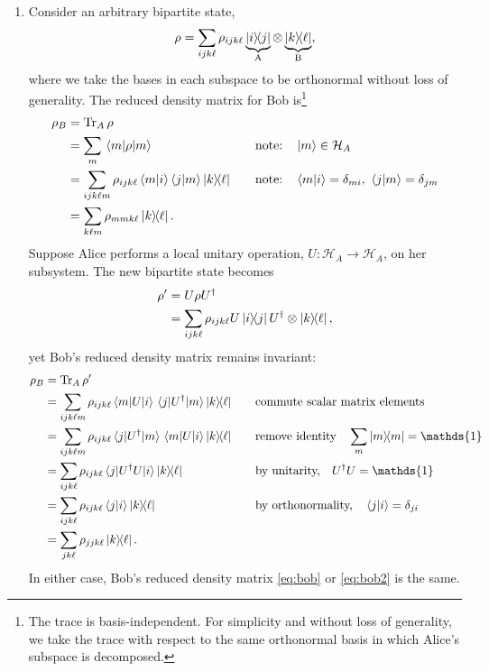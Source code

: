 \documentclass[12pt]{article}
\newcommand*\id{\mathds{1}}
\begin{document}
\begin{appendices}
\begin{enumerate}[label=\alph*)]
\item Consider an arbitrary bipartite state,
\[\rho = \sum_{ijk\ell}\rho_{ijk\ell}
\underbrace{\ketbra{i}{j}}_\text{A} \otimes
\underbrace{\ketbra{k}{\ell}}_\text{B},\]
where we take the bases in each subspace to be orthonormal without loss of generality. The reduced density matrix for Bob is\footnote{The trace is basis-independent. For simplicity and without loss of generality, we take the trace with respect to the same orthonormal basis in which Alice's subspace is decomposed.}
\begin{align}
    \rho_B &= \Tr_A\rho && \\
    &= \sum_m \ev{\rho}{m}
        &&\qq{note:} \ket{m} \in \mathcal{H}_A \\
    &= \sum_{ijk\ell m}\rho_{ijk\ell}
        \braket{m}{i}\braket{j}{m} \ketbra{k}{\ell}
        &&\qq{note:} \braket{m}{i} = \delta_{mi},\
            \braket{j}{m} = \delta_{jm} \\
    &= \sum_{k\ell m}\rho_{mmk\ell} \ketbra{k}{\ell}. && \label{eq:bob}
\end{align}
Suppose Alice performs a local unitary operation, $U : \mathcal{H}_A \rightarrow \mathcal{H}_A$, on her subsystem. The new bipartite state becomes
\begin{align}
    \rho' &= U\rho U^\dag\\
    &= \sum_{ijk\ell}\rho_{ijk\ell}
        U\ketbra{i}{j}U^\dag \otimes \ketbra{k}{\ell},
\end{align}
yet Bob's reduced density matrix remains invariant:
\begin{align}
    \rho_B &= \Tr_A\rho' && \\
    &= \sum_{ijk\ell m}\rho_{ijk\ell}
        \mel{m}{U}{i}\mel{j}{U^\dag}{m} \ketbra{k}{\ell}
        &&\qq{commute scalar matrix elements} \\
    &= \sum_{ijk\ell m}\rho_{ijk\ell}
        \mel{j}{U^\dag}{m}\mel{m}{U}{i} \ketbra{k}{\ell}
        &&\qq{remove identity} \sum_m\ketbra{m} = \id \\
    &= \sum_{ijk\ell}\rho_{ijk\ell}
        \mel{j}{U^\dag U}{i} \ketbra{k}{\ell}
        &&\qq{by unitarity,} U^\dag U = \id \\
    &= \sum_{ijk\ell}\rho_{ijk\ell}
        \braket{j}{i} \ketbra{k}{\ell}
        &&\qq{by orthonormality,} \braket{j}{i} = \delta_{ji} \\
    &= \sum_{jk\ell}\rho_{jjk\ell} \ketbra{k}{\ell}. && \label{eq:bob2}
\end{align}
In either case, Bob's reduced density matrix \eqref{eq:bob} or \eqref{eq:bob2} is the same.


\end{enumerate}
\end{appendices}
\end{document}
